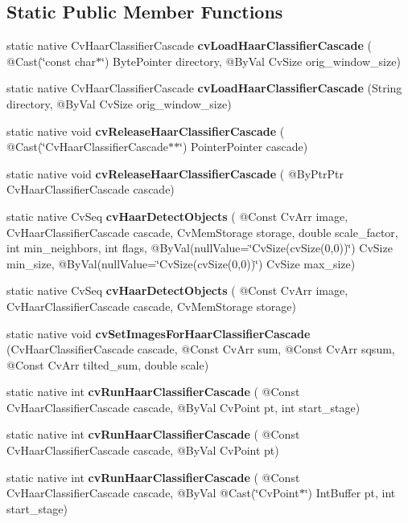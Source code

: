 \subsection*{Static Public Member Functions}
\begin{DoxyCompactItemize}
\item 
static native Cv\+Haar\+Classifier\+Cascade {\bfseries cv\+Load\+Haar\+Classifier\+Cascade} ( @Cast(\char`\"{}const char$\ast$\char`\"{}) Byte\+Pointer directory, @By\+Val Cv\+Size orig\+\_\+window\+\_\+size)
\item 
static native Cv\+Haar\+Classifier\+Cascade {\bfseries cv\+Load\+Haar\+Classifier\+Cascade} (String directory, @By\+Val Cv\+Size orig\+\_\+window\+\_\+size)
\item 
static native void {\bfseries cv\+Release\+Haar\+Classifier\+Cascade} ( @Cast(\char`\"{}Cv\+Haar\+Classifier\+Cascade$\ast$$\ast$\char`\"{}) Pointer\+Pointer cascade)
\item 
static native void {\bfseries cv\+Release\+Haar\+Classifier\+Cascade} ( @By\+Ptr\+Ptr Cv\+Haar\+Classifier\+Cascade cascade)
\item 
static native Cv\+Seq {\bfseries cv\+Haar\+Detect\+Objects} ( @Const Cv\+Arr image, Cv\+Haar\+Classifier\+Cascade cascade, Cv\+Mem\+Storage storage, double scale\+\_\+factor, int min\+\_\+neighbors, int flags, @By\+Val(null\+Value=\char`\"{}Cv\+Size(cv\+Size(0,0))\char`\"{}) Cv\+Size min\+\_\+size, @By\+Val(null\+Value=\char`\"{}Cv\+Size(cv\+Size(0,0))\char`\"{}) Cv\+Size max\+\_\+size)
\item 
static native Cv\+Seq {\bfseries cv\+Haar\+Detect\+Objects} ( @Const Cv\+Arr image, Cv\+Haar\+Classifier\+Cascade cascade, Cv\+Mem\+Storage storage)
\item 
static native void {\bfseries cv\+Set\+Images\+For\+Haar\+Classifier\+Cascade} (Cv\+Haar\+Classifier\+Cascade cascade, @Const Cv\+Arr sum, @Const Cv\+Arr sqsum, @Const Cv\+Arr tilted\+\_\+sum, double scale)
\item 
static native int {\bfseries cv\+Run\+Haar\+Classifier\+Cascade} ( @Const Cv\+Haar\+Classifier\+Cascade cascade, @By\+Val Cv\+Point pt, int start\+\_\+stage)
\item 
static native int {\bfseries cv\+Run\+Haar\+Classifier\+Cascade} ( @Const Cv\+Haar\+Classifier\+Cascade cascade, @By\+Val Cv\+Point pt)
\item 
static native int {\bfseries cv\+Run\+Haar\+Classifier\+Cascade} ( @Const Cv\+Haar\+Classifier\+Cascade cascade, @By\+Val @Cast(\char`\"{}Cv\+Point$\ast$\char`\"{}) Int\+Buffer pt, int start\+\_\+stage)
$$
\end{DoxyCompactItemize}
